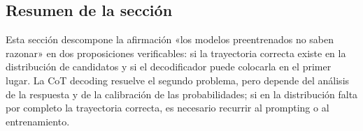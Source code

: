 \subsection{Resumen de la sección}

Esta sección descompone la afirmación «los modelos preentrenados no saben razonar» en dos proposiciones verificables: si la trayectoria correcta existe en la distribución de candidatos y si el decodificador puede colocarla en el primer lugar. La CoT decoding resuelve el segundo problema, pero depende del análisis de la respuesta y de la calibración de las probabilidades; si en la distribución falta por completo la trayectoria correcta, es necesario recurrir al prompting o al entrenamiento.
